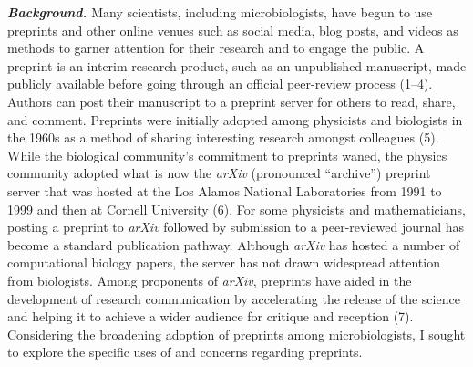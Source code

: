 \documentclass[11pt,]{article}
\begin{document}
\textbf{\emph{Background.}} Many scientists, including microbiologists,
have begun to use preprints and other online venues such as social
media, blog posts, and videos as methods to garner attention for their
research and to engage the public. A preprint is an interim research
product, such as an unpublished manuscript, made publicly available
before going through an official peer-review process (1--4). Authors can
post their manuscript to a preprint server for others to read, share,
and comment. Preprints were initially adopted among physicists and
biologists in the 1960s as a method of sharing interesting research
amongst colleagues (5). While the biological community's commitment to
preprints waned, the physics community adopted what is now the
\emph{arXiv} (pronounced ``archive'') preprint server that was hosted at
the Los Alamos National Laboratories from 1991 to 1999 and then at
Cornell University (6). For some physicists and mathematicians, posting
a preprint to \emph{arXiv} followed by submission to a peer-reviewed
journal has become a standard publication pathway. Although \emph{arXiv}
has hosted a number of computational biology papers, the server has not
drawn widespread attention from biologists. Among proponents of
\emph{arXiv}, preprints have aided in the development of research
communication by accelerating the release of the science and helping it
to achieve a wider audience for critique and reception (7). Considering
the broadening adoption of preprints among microbiologists, I sought to
explore the specific uses of and concerns regarding preprints.
\end{document}
